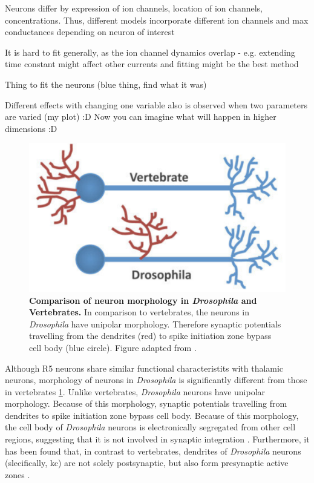 \documentclass[../main.tex]{subfiles}
\begin{document}
Neurons differ by expression of ion channels, location of ion channels, concentrations. Thus,
different models incorporate different ion channels and max conductances depending on neuron of interest

It is hard to fit generally, as the ion channel dynamics overlap - e.g. extending time constant
might affect other currents and fitting might be the best method

Thing to fit the neurons (blue thing, find what it was)

Different effects with changing one variable also is observed when two parameters are varied (my plot) :D Now you can imagine what will happen in higher dimensions :D

\begin{figure}[!t]
    \centering
    \includegraphics[width=0.55\linewidth]{../img/modeling_r5/examples/drosophila_neuron_morphology.png}
    \caption[Neuron morphology in \textit{Drosophila} and Vertebrates]{
        \textbf{Comparison of neuron morphology in \textit{Drosophila} and Vertebrates.}
        In comparison to vertebrates,
        the neurons in \textit{Drosophila} have unipolar morphology. Therefore synaptic potentials
        travelling from the dendrites (red) to spike initiation zone bypass cell body
        (blue circle). Figure adapted from \parencite{spindlerBazookaMediatesSecondary2011}.
    }
    \label{fig:morphology_drosphila_vs_mammalian}
\end{figure}

Although R5 neurons share similar functional characteristits with thalamic neurons,
morphology of neurons in \textit{Drosophila} is significantly different from those in vertebrates
\ref{fig:morphology_drosphila_vs_mammalian}. 
Unlike vertebrates, \textit{Drosophila} neurons have unipolar morphology. Because of this morphology,
synaptic potentials travelling from dendrites to spike initiation zone bypass cell body.
Because of this morphology, the cell body of \textit{Drosophila} neurons is
electronically segregated from other cell regions, suggesting that it is not involved
in synaptic integration \parencite{gouwensSignalPropagationDrosophila2009,tuthillLessonsCompartmentalModel2009}.
Furthermore, it has been found that, in contrast to vertebrates, dendrites of
\textit{Drosophila} neurons (slecifically, \gls{kc}) are not solely postsynaptic, but
also form presynaptic active zones \parencite{christiansenPresynapsesKenyonCell2011}.
\end{document}
